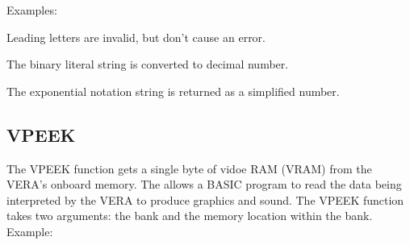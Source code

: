 Examples:\\


Leading letters are invalid, but don't cause an error.\\


The binary literal string is converted to decimal number.\\


The exponential notation string is returned as a simplified number.\\


\subsection{VPEEK}

The {\ttfamily VPEEK} function gets a single byte of vidoe RAM (VRAM) from the
VERA's onboard memory.  The allows a BASIC program to read the data being
interpreted by the VERA to produce graphics and sound.  The {\ttfamily VPEEK}
function takes two arguments: the bank and the memory location within the bank.\\

Example:\\


